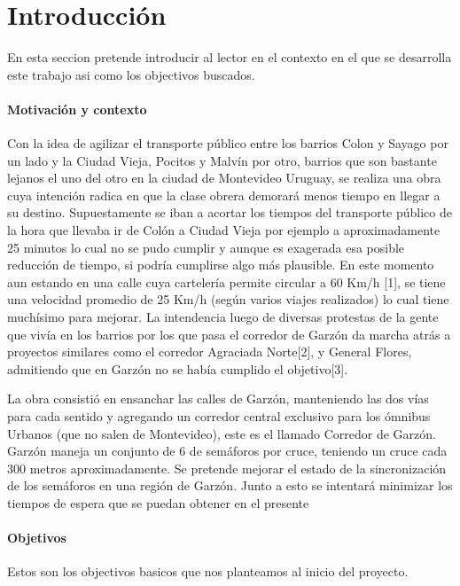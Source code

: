 \chapter{Introducción}
En esta seccion pretende introducir al lector en el contexto en el que se desarrolla este trabajo asi como los objectivos buscados.

\subsubsection{Motivación y contexto}
Con  la  idea  de  agilizar  el  transporte  público  entre  los
barrios Colon y Sayago por un lado y la Ciudad Vieja, Pocitos
y Malvín por otro, barrios que son bastante lejanos el uno del
otro en la ciudad de Montevideo Uruguay, se realiza una obra
cuya  intención radica  en que la  clase obrera demorará  menos
tiempo en llegar a su destino.
Supuestamente se iban a acortar los tiempos del transporte
público de la hora que llevaba ir de Colón a Ciudad Vieja por
ejemplo  a  aproximadamente  25  minutos  lo  cual  no  se  pudo
cumplir  y  aunque  es  exagerada  esa  posible  reducción  de
tiempo,  si  podría  cumplirse  algo  más  plausible.  En  este
momento  aun  estando  en  una  calle  cuya  cartelería  permite
circular a 60 Km/h  [1], se tiene una velocidad promedio de 25
Km/h (según varios viajes realizados) lo cual tiene muchísimo
para mejorar.
La intendencia luego de diversas protestas de la gente que
vivía en los barrios por los que pasa el corredor de Garzón da
marcha atrás a proyectos similares como el corredor Agraciada
Norte[2],  y  General  Flores,  admitiendo  que  en  Garzón  no  se
había cumplido el objetivo[3].

La  obra  consistió  en  ensanchar  las  calles  de  Garzón,
manteniendo  las  dos  vías  para  cada  sentido  y  agregando  un
corredor central exclusivo para los ómnibus Urbanos (que no
salen de Montevideo), este es el llamado Corredor de Garzón.
Garzón  maneja  un  conjunto de 6 de  semáforos por  cruce,
teniendo  un  cruce  cada  300  metros  aproximadamente.  Se
pretende  mejorar  el  estado  de  la  sincronización  de  los
semáforos en  una región de Garzón. Junto a esto se intentará
minimizar los tiempos de espera que se puedan obtener en el
presente
\newpage

\subsubsection{Objetivos}

Estos son los objectivos basicos que nos planteamos al inicio del  proyecto.


